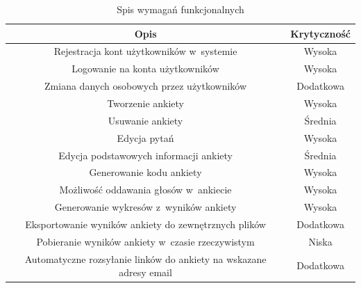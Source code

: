 \documentclass[8pt,a4paper,notitlepage]{article}
\begin{document}
\begin{center}
\begin{table}[H]
\caption{Spis wymagań funkcjonalnych}
  \begin{tabular}{| c| c|}%

    \hline
    Opis & Krytyczność \\ \hline \hline
   Rejestracja kont użytkowników w~systemie	&	Wysoka	\\ \hline
   
   
Logowanie na konta użytkowników	&	Wysoka	\\ \hline


Zmiana danych osobowych przez użytkowników & Dodatkowa	\\ \hline


Tworzenie ankiety 	&	Wysoka	\\ \hline

Usuwanie ankiety & Średnia \\ \hline


Edycja pytań 	&	Wysoka	\\ \hline

Edycja podstawowych informacji ankiety &	Średnia 	\\ \hline


Generowanie kodu ankiety	&	Wysoka	\\ \hline


Możliwość oddawania głosów w~ankiecie 	&	Wysoka	\\ \hline

Generowanie wykresów z~wyników ankiety	&	Wysoka	\\ \hline

Eksportowanie wyników ankiety do zewnętrznych plików	&	Dodatkowa	\\ \hline

Pobieranie wyników ankiety w~czasie rzeczywistym & Niska \\ \hline

Automatyczne rozsyłanie linków do ankiety na wskazane adresy email & Dodatkowa \\ \hline


    \hline
  \end{tabular}
\end{table}
\end{center}
\end{document}
